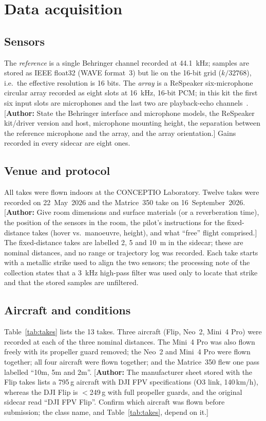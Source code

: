 \documentclass[journal]{IEEEtran}
\newif\ifshowauthornotes\showauthornotestrue
\newcommand{\authornote}[1]{\ifshowauthornotes{\color{red!70!black}[\textbf{Author:} #1]}\fi}
\begin{document}
\section{Data acquisition}\label{sec:acq}
\subsection{Sensors}
The \emph{reference} is a single Behringer channel recorded at \SI{44.1}{\kilo\hertz}; samples are stored as IEEE float32 (WAVE format~3) but lie on the 16-bit grid ($k/32768$), i.e.\ the effective resolution is 16 bits.
The \emph{array} is a ReSpeaker six-microphone circular array recorded as eight slots at \SI{16}{\kilo\hertz}, 16-bit PCM; in this kit the first six input slots are microphones and the last two are playback-echo channels~\cite{seeedwiki6mic}.
\authornote{State the Behringer interface and microphone models, the ReSpeaker kit/driver version and host, microphone mounting height, the separation between the reference microphone and the array, and the array orientation.}
Gains recorded in every sidecar are eight ones.

\subsection{Venue and protocol}
All takes were flown indoors at the CONCEPTIO Laboratory.
Twelve takes were recorded on 22~May~2026 and the Matrice~350 take on 16~September~2026.
\authornote{Give room dimensions and surface materials (or a reverberation time), the position of the sensors in the room, the pilot's instructions for the fixed-distance takes (hover vs.\ manoeuvre, height), and what ``free'' flight comprised.}
The fixed-distance takes are labelled 2, 5 and \SI{10}{\meter} in the sidecar; these are nominal distances, and no range or trajectory log was recorded.
Each take starts with a metallic strike used to align the two sensors; the processing note of the collection states that a \SI{3}{\kilo\hertz} high-pass filter was used only to locate that strike and that the stored samples are unfiltered.

\subsection{Aircraft and conditions}
Table~\ref{tab:takes} lists the 13 takes.
Three aircraft (Flip, Neo~2, Mini~4 Pro) were recorded at each of the three nominal distances.
The Mini~4 Pro was also flown freely with its propeller guard removed; the Neo~2 and Mini~4 Pro were flown together; all four aircraft were flown together; and the Matrice~350 flew one pass labelled ``10m, 5m and 2m''.
\authornote{The manufacturer sheet stored with the Flip takes lists a 795\,g aircraft with DJI FPV specifications (O3 link, 140\,km/h), whereas the DJI Flip is $<$249\,g with full propeller guards, and the original sidecar read ``DJI FPV Flip''. Confirm which aircraft was flown before submission; the class name, and Table~\ref{tab:takes}, depend on it.}
\end{document}
